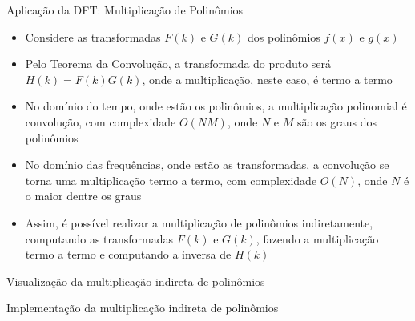 \begin{frame}[fragile]{Aplicação da DFT: Multiplicação de Polinômios}

    \begin{itemize}
        \item Considere as transformadas $F(k)$ e $G(k)$ dos polinômios $f(x)$ e $g(x)$

        \item Pelo Teorema da Convolução, a transformada do produto será $H(k) = F(k)G(k)$, onde
            a multiplicação, neste caso, é termo a termo

        \item No domínio do tempo, onde estão os polinômios, a multiplicação polinomial é 
            convolução, com complexidade $O(NM)$, onde $N$ e $M$ são os graus dos polinômios

        \item No domínio das frequências, onde estão as transformadas, a convolução se torna
            uma multiplicação termo a termo, com complexidade $O(N)$, onde $N$ é o maior dentre os graus

        \item Assim, é possível realizar a multiplicação de polinômios indiretamente, computando
            as transformadas $F(k)$ e $G(k)$, fazendo a multiplicação termo a termo e computando
            a inversa de $H(k)$
    \end{itemize}

\end{frame}

\begin{frame}[fragile]{Visualização da multiplicação indireta de polinômios}

    \begin{figure}
        \centering


    \end{figure}

\end{frame}

\begin{frame}[fragile]{Implementação da multiplicação indireta de polinômios}
\end{frame}

